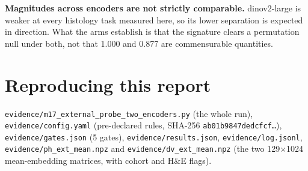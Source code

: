 \documentclass[11pt,a4paper]{article}
\begin{document}
\textbf{Magnitudes across encoders are not strictly comparable.} dinov2-large is weaker at every
histology task measured here, so its lower separation is expected in direction. What the arms
establish is that the signature clears a permutation null under both, not that 1.000 and 0.877 are
commensurable quantities.

\section*{Reproducing this report}

\texttt{evidence/m17\_external\_probe\_two\_encoders.py} (the whole run),
\texttt{evidence/config.yaml} (pre-declared rules, SHA-256
\texttt{ab01b9847dedcfcf\ldots}), \texttt{evidence/gates.json} (5 gates),
\texttt{evidence/results.json}, \texttt{evidence/log.jsonl},
\texttt{evidence/ph\_ext\_mean.npz} and \texttt{evidence/dv\_ext\_mean.npz} (the two
129$\times$1024 mean-embedding matrices, with cohort and H\&E flags).
\end{document}
